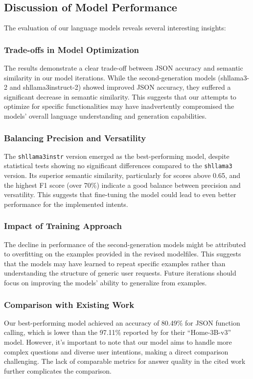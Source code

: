 \subsection{Discussion of Model Performance}
The evaluation of our language models reveals several interesting insights:
\subsubsection{Trade-offs in Model Optimization}
The results demonstrate a clear trade-off between JSON accuracy and semantic similarity in our model iterations. While the second-generation models (shllama3-2 and shllama3instruct-2) showed improved JSON accuracy, they suffered a significant decrease in semantic similarity. This suggests that our attempts to optimize for specific functionalities may have inadvertently compromised the models' overall language understanding and generation capabilities.
\subsubsection{Balancing Precision and Versatility}
The \texttt{shllama3instr} version emerged as the best-performing model, despite statistical tests showing no significant differences compared to the \texttt{shllama3} version. Its superior semantic similarity, particularly for scores above 0.65, and the highest F1 score (over 70\%) indicate a good balance between precision and versatility. This suggests that fine-tuning the model could lead to even better performance for the implemented intents.


\subsubsection{Impact of Training Approach}
The decline in performance of the second-generation models might be attributed to overfitting on the examples provided in the revised modelfiles. This suggests that the models may have learned to repeat specific examples rather than understanding the structure of generic user requests. Future iterations should focus on improving the models' ability to generalize from examples.
\subsubsection{Comparison with Existing Work}
Our best-performing model achieved an accuracy of 80.49\% for JSON function calling, which is lower than the 97.11\% reported by \citet{acon96_home_llm} for their ``Home-3B-v3'' model. However, it's important to note that our model aims to handle more complex questions and diverse user intentions, making a direct comparison challenging. The lack of comparable metrics for answer quality in the cited work further complicates the comparison.

